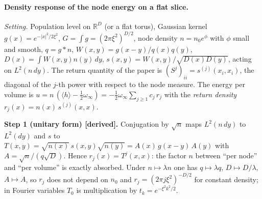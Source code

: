 
\paragraph{Density response of the node energy on a flat slice.}
\emph{Setting.} Population level on $\mathbb{R}^D$ (or a flat torus), Gaussian kernel
$g(x)=e^{-|x|^2/2\xi^2}$, $G=\int g=(2\pi\xi^2)^{D/2}$, node density $n=n_0e^{\phi}$ with $\phi$ small and smooth,
$q=g*n$, $W(x,y)=g(x-y)/q(x)q(y)$, $D(x)=\int W(x,y)n(y)\,dy$, $s(x,y)=W(x,y)/\sqrt{D(x)D(y)}$, acting on
$L^2(n\,dy)$. The return quantity of the paper is $(S^j)_{ii}=s^{(j)}(x_i,x_i)$, the diagonal of the $j$-th power
with respect to the node measure. The energy per volume is
$u=n\,(\langle h\rangle-\tfrac12\omega_\infty)=-\tfrac12\omega_\infty\sum_{j\ge1}c_j\,r_j$ with the
\emph{return density} $r_j(x)=n(x)\,s^{(j)}(x,x)$.

\smallskip\noindent\textbf{Step 1 (unitary form) [derived].} Conjugation by $\sqrt n$ maps $L^2(n\,dy)$ to $L^2(dy)$ and
$s$ to $T(x,y)=\sqrt{n(x)}\,s(x,y)\sqrt{n(y)}=A(x)\,g(x-y)\,A(y)$ with $A=\sqrt n/(q\sqrt D)$. Hence
$r_j(x)=T^j(x,x)$: the factor $n$ between ``per node'' and ``per volume'' is exactly absorbed. Under $n\mapsto\lambda n$
one has $q\mapsto\lambda q$, $D\mapsto D/\lambda$, $A\mapsto A$, so $r_j$ does not depend on $n_0$ and
$r_j=(2\pi j\xi^2)^{-D/2}$ for constant density; in Fourier variables $T_0$ is multiplication by
$t_k=e^{-\xi^2k^2/2}$.

